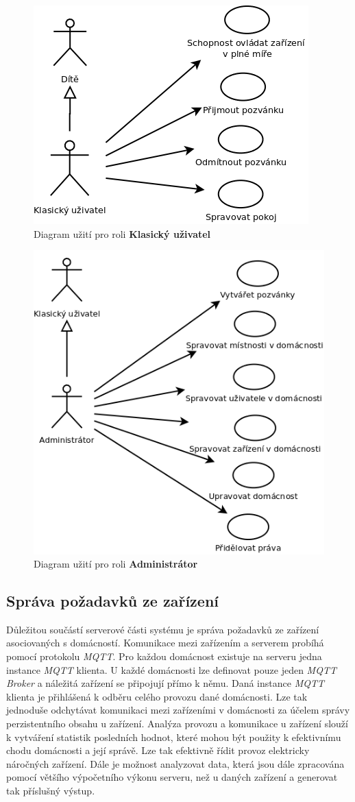 \begin{figure}[hbt]
  \centering
  \includegraphics[width=0.4 \linewidth]{obrazky-figures/useCaseUser.png}
  \caption{Diagram užití pro roli \textbf{Klasický uživatel}}
  \label{figure:use_case_uzivatel}
\end{figure}

\begin{figure}[hbt]
  \centering
  \includegraphics[width=0.4 \linewidth]{obrazky-figures/useCaseAdmin.png}
  \caption{Diagram užití pro roli \textbf{Administrátor}}
  \label{figure:use_case_admin}
\end{figure}

\newpage
\subsection*{Správa požadavků ze zařízení}
\label{backend:mqtt}

Důležitou součástí serverové části systému je správa požadavků ze zařízení asociovaných s domácností.
Komunikace mezi zařízením a serverem probíhá pomocí protokolu \emph{MQTT}.
Pro každou domácnost existuje na serveru jedna instance \emph{MQTT} klienta.
U každé domácnosti lze definovat pouze jeden \emph{MQTT Broker} a náležitá zařízení se připojují přímo k němu.
Daná instance \emph{MQTT} klienta je přihlášená k odběru celého provozu dané domácnosti.
Lze tak jednoduše odchytávat komunikaci mezi zařízeními v domácnosti za účelem správy perzistentního obsahu u zařízení.
Analýza provozu a komunikace u zařízení slouží k vytváření statistik posledních hodnot, které mohou být použity k efektivnímu chodu domácnosti a její správě.
Lze tak efektivně řídit provoz elektricky náročných zařízení. Dále je možnost analyzovat data, která jsou dále zpracována pomocí většího výpočetního výkonu serveru, než u daných zařízení a generovat tak příslušný výstup.

